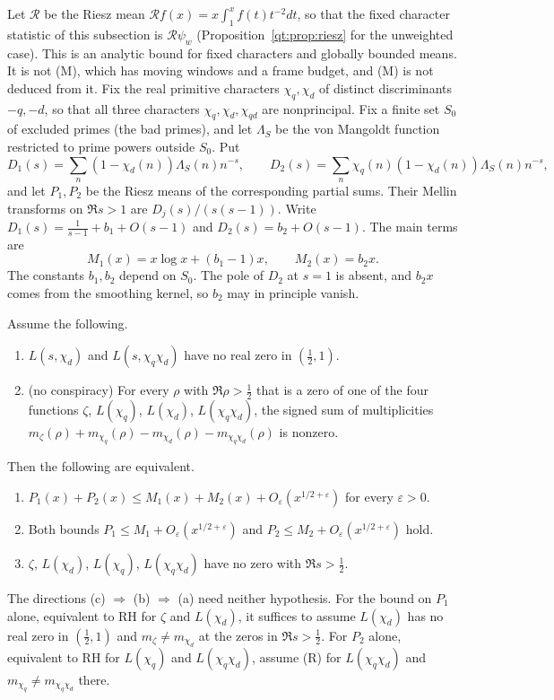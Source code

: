 Let $\mathcal R$ be the Riesz mean $\mathcal Rf(x)=x\int_1^xf(t)t^{-2}dt$, so that the fixed character statistic of this subsection is $\mathcal R\psi_w$ (Proposition~\ref{qt:prop:riesz} for the unweighted case). This is an analytic bound for fixed characters and globally bounded means. It is not (M), which has moving windows and a frame budget, and (M) is not deduced from it. Fix the real primitive characters $\chi_q,\chi_d$ of distinct discriminants $-q,-d$, so that all three characters $\chi_q,\chi_d,\chi_{qd}$ are nonprincipal. Fix a finite set $S_0$ of excluded primes (the bad primes), and let $\Lambda_S$ be the von Mangoldt function restricted to prime powers outside $S_0$. Put
\[
D_1(s)=\sum_n(1-\chi_d(n))\Lambda_S(n)n^{-s},\qquad D_2(s)=\sum_n\chi_q(n)(1-\chi_d(n))\Lambda_S(n)n^{-s},
\]
and let $P_1,P_2$ be the Riesz means of the corresponding partial sums. Their Mellin transforms on $\Re s>1$ are $D_j(s)/(s(s-1))$. Write $D_1(s)=\frac1{s-1}+b_1+O(s-1)$ and $D_2(s)=b_2+O(s-1)$. The main terms are
\[
M_1(x)=x\log x+(b_1-1)x,\qquad M_2(x)=b_2x.
\]
The constants $b_1,b_2$ depend on $S_0$. The pole of $D_2$ at $s=1$ is absent, and $b_2x$ comes from the smoothing kernel, so $b_2$ may in principle vanish.

\begin{theorem}\label{mqg:thm:splitting}
Assume the following.
\begin{enumerate}
\item[(R)] $L(s,\chi_d)$ and $L(s,\chi_q\chi_d)$ have no real zero in $(\frac12,1)$.
\item[(NC)] (no conspiracy) For every $\rho$ with $\Re\rho>\frac12$ that is a zero of one of the four functions $\zeta$, $L(\chi_q)$, $L(\chi_d)$, $L(\chi_q\chi_d)$, the signed sum of multiplicities $m_\zeta(\rho)+m_{\chi_q}(\rho)-m_{\chi_d}(\rho)-m_{\chi_q\chi_d}(\rho)$ is nonzero.
\end{enumerate}
Then the following are equivalent.
\begin{enumerate}
\item[(a)] $P_1(x)+P_2(x)\le M_1(x)+M_2(x)+O_\varepsilon(x^{1/2+\varepsilon})$ for every $\varepsilon>0$.
\item[(b)] Both bounds $P_1\le M_1+O_\varepsilon(x^{1/2+\varepsilon})$ and $P_2\le M_2+O_\varepsilon(x^{1/2+\varepsilon})$ hold.
\item[(c)] $\zeta$, $L(\chi_d)$, $L(\chi_q)$, $L(\chi_q\chi_d)$ have no zero with $\Re s>\frac12$.
\end{enumerate}
The directions (c) $\Rightarrow$ (b) $\Rightarrow$ (a) need neither hypothesis. For the bound on $P_1$ alone, equivalent to RH for $\zeta$ and $L(\chi_d)$, it suffices to assume $L(\chi_d)$ has no real zero in $(\frac12,1)$ and $m_\zeta\ne m_{\chi_d}$ at the zeros in $\Re s>\frac12$. For $P_2$ alone, equivalent to RH for $L(\chi_q)$ and $L(\chi_q\chi_d)$, assume (R) for $L(\chi_q\chi_d)$ and $m_{\chi_q}\ne m_{\chi_q\chi_d}$ there.
\end{theorem}

